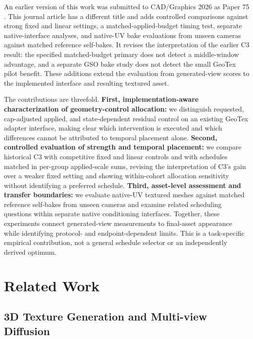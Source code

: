 \documentclass[times,twocolumn,final]{elsarticle}
\begin{document}
An earlier version of this work was submitted to CAD/Graphics 2026 as Paper 75 \cite{che2026cadgraphics}. This journal article has a different title and adds controlled comparisons against strong fixed and linear settings, a matched-applied-budget timing test, separate native-interface analyses, and native-UV bake evaluations from unseen cameras against matched reference self-bakes. It revises the interpretation of the earlier C3 result: the specified matched-budget primary does not detect a middle-window advantage, and a separate GSO bake study does not detect the small GeoTex pilot benefit. These additions extend the evaluation from generated-view scores to the implemented interface and resulting textured asset.

The contributions are threefold. \textbf{First, implementation-aware characterization of geometry-control allocation:} we distinguish requested, cap-adjusted applied, and state-dependent residual control on an existing GeoTex adapter interface, making clear which intervention is executed and which differences cannot be attributed to temporal placement alone. \textbf{Second, controlled evaluation of strength and temporal placement:} we compare historical C3 with competitive fixed and linear controls and with schedules matched in per-group applied-scale sums, revising the interpretation of C3's gain over a weaker fixed setting and showing within-cohort allocation sensitivity without identifying a preferred schedule. \textbf{Third, asset-level assessment and transfer boundaries:} we evaluate native-UV textured meshes against matched reference self-bakes from unseen cameras and examine related scheduling questions within separate native conditioning interfaces. Together, these experiments connect generated-view measurements to final-asset appearance while identifying protocol- and endpoint-dependent limits. This is a task-specific empirical contribution, not a general schedule selector or an independently derived optimum.

\section{Related Work}
\label{sec:related}

\subsection{3D Texture Generation and Multi-view Diffusion}
\label{subsec:3dtex}
\end{document}
